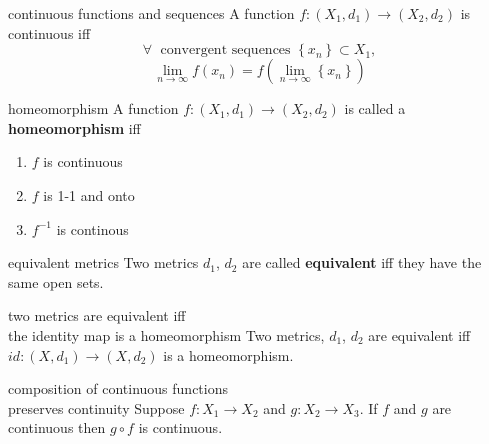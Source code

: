 \documentclass[avery5371,grid]{flashcards}
\begin{document}
\begin{flashcard}[Theorem]{continuous functions and sequences}
A function $f:(X_1,d_1) \rightarrow (X_2,d_2)$ is continuous iff
\begin{equation*}
\forall \; \mbox{ convergent sequences } \left\{ x_n \right\} \subset X_1,
\end{equation*}
\begin{equation*}
\lim_{n\rightarrow \infty} f(x_n) = f(\lim_{n\rightarrow \infty}
\left\{ x_n \right\})
\end{equation*}
\end{flashcard}

\begin{flashcard}[Definition]{homeomorphism}
A function $f:(X_1,d_1) \rightarrow (X_2,d_2)$ is called a
\mbox{\textbf{homeomorphism}} iff
\begin{enumerate}
 \item $f$ is continuous
 \item $f$ is 1-1 and onto
 \item $f^{-1}$ is continous
\end{enumerate}
\end{flashcard}

\begin{flashcard}[Definition]{equivalent metrics}
Two metrics $d_1$, $d_2$ are called \mbox{\textbf{equivalent}} iff
they have the same open sets.
\end{flashcard}

\begin{flashcard}[Remark]{two metrics are equivalent iff \\
the identity map is a homeomorphism}
Two metrics, $d_1$, $d_2$ are equivalent iff $id: (X,d_1) \rightarrow (X,d_2)$
is a homeomorphism.
\end{flashcard}

\begin{flashcard}[Theorem]{composition of continuous functions \\
preserves continuity}
Suppose $f:X_1 \rightarrow X_2$ and $g:X_2 \rightarrow X_3$.  If $f$
and $g$ are continuous then $g\circ f$ is continuous.
\end{flashcard}
\end{document}
